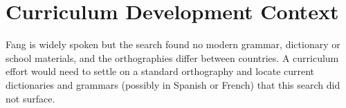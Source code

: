 \documentclass[12pt]{article}
\begin{document}
\section{Curriculum Development Context}
Fang is widely spoken but the search found no modern grammar, dictionary or school materials, and the orthographies differ between countries. A curriculum effort would need to settle on a standard orthography and locate current dictionaries and grammars (possibly in Spanish or French) that this search did not surface.
\end{document}
